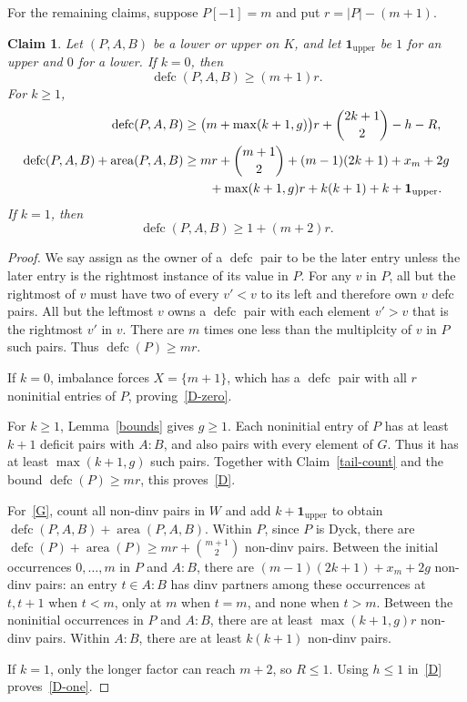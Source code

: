 \documentclass[11pt]{article}
\DeclareMathOperator{\area}{area}\DeclareMathOperator{\dinv}{dinv}
\DeclareMathOperator{\defc}{defc}\DeclareMathOperator{\sym}{sym}
\newtheorem{claim}{Claim}
\begin{document}
For the remaining claims, suppose $P[-1]=m$ and put $r=|P|-(m+1)$.

\begin{claim}\label{maximum-estimates}
Let $(P,A,B)$ be a lower or upper on $K$, and let $\mathbf1_{\mathrm{upper}}$ be $1$ for an upper and $0$ for a lower.
If $k=0$, then
\begin{equation}\label{D-zero}
 \defc(P,A,B)\ge(m+1)r.
\end{equation}
For $k\ge1$,
\begin{align}
 \defc(P,A,B)&\ge\bigl(m+\max(k+1,g)\bigr)r+\binom{2k+1}{2}-h-R,\label{D}\\
 \defc(P,A,B)+\area(P,A,B)&\ge mr+\binom{m+1}2+(m-1)(2k+1)+x_m+2g\notag\\
 &\qquad+\max(k+1,g)r+k(k+1)+k+\mathbf1_{\mathrm{upper}}.\label{G}
\end{align}
If $k=1$, then
\begin{equation}\label{D-one}
 \defc(P,A,B)\ge1+(m+2)r.
\end{equation}
\end{claim}
\begin{proof}
We say assign as the owner of a $\defc$ pair to be the later entry unless the later entry is the rightmost instance of its value in $P$.  For any $v$ in $P$, all but the rightmost of $v$ must have two of every $v'<v$ to its left and therefore own $v$ defc pairs.  All but the leftmost $v$ owns a $\defc$ pair with each element $v'>v$ that is the rightmost $v'$ in $v$.  There are $m$ times one less than the multiplcity of $v$ in $P$ such pairs. Thus  $\defc(P)\ge mr$.

If $k=0$, imbalance forces $X=\{m+1\}$, which has a $\defc$ pair with all $r$ noninitial entries of $P$, proving~\eqref{D-zero}.

For $k\ge1$, Lemma~\ref{bounds} gives $g\ge1$. Each noninitial entry of $P$ has at least $k+1$ deficit pairs with $A:B$, and also pairs with every element of $G$. Thus it has at least $\max(k+1,g)$ such pairs. Together with Claim~\ref{tail-count} and the bound $\defc(P)\ge mr$, this proves~\eqref{D}.

For~\eqref{G}, count all non-dinv pairs in $W$ and add $k+\mathbf1_{\mathrm{upper}}$ to obtain $\defc(P,A,B)+\area(P,A,B)$.
Within $P$, since $P$ is Dyck, there are $\defc(P)+\area(P)\ge mr+\binom{m+1}2$ non-dinv pairs.
Between the initial occurrences $0,\ldots,m$ in $P$ and $A:B$, there are $(m-1)(2k+1)+x_m+2g$ non-dinv pairs: an entry $t\in A:B$ has dinv partners among these occurrences at $t,t+1$ when $t<m$, only at $m$ when $t=m$, and none when $t>m$.
Between the noninitial occurrences in $P$ and $A:B$, there are at least $\max(k+1,g)r$ non-dinv pairs.
Within $A:B$, there are at least $k(k+1)$ non-dinv pairs.

If $k=1$, only the longer factor can reach $m+2$, so $R\le1$. Using $h\le1$ in~\eqref{D} proves~\eqref{D-one}.
\end{proof}
\end{document}
